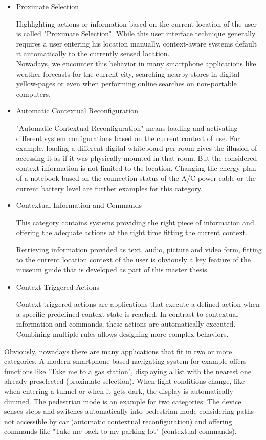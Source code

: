 \begin{itemize}
\item Proximate Selection

Highlighting actions or information based on the current location of the user is called "Proximate Selection". While this user interface technique generally requires a user entering his location manually, context-aware systems default it automatically to the currently sensed location. \\
Nowadays, we encounter this behavior in many smartphone applications like weather forecasts for the current city, searching nearby stores in digital yellow-pages or even when performing online searches on non-portable computers.

\item Automatic Contextual Reconfiguration

"Automatic Contextual Reconfiguration" means loading and activating different system configurations based on the current context of use. For example, loading a different digital whiteboard per room gives the illusion of accessing it as if it was physically mounted in that room. But the considered context information is not limited to the location. Changing the energy plan of a notebook based on the connection status of the A/C power cable or the current battery level are further examples for this category. 

\item Contextual Information and Commands

This category contains systems providing the right piece of information and offering the adequate actions at the right time fitting the current context.

Retrieving information provided as text, audio, picture and video form, fitting to the current location context of the user is obviously a key feature of the museum guide that is developed as part of this master thesis.

\item Context-Triggered Actions

Context-triggered actions are applications that execute a defined action when a specific predefined context-state is reached. In contrast to contextual information and commands, these actions are automatically executed. Combining multiple rules allows designing more complex behaviors.

\end{itemize}




Obviously, nowadays there are many applications that fit in two or more categories. A modern smartphone based navigating system for example offers functions like "Take me to a gas station", displaying a list with the nearest one already preselected (proximate selection). When light conditions change, like when entering a tunnel or when it gets dark, the display is automatically dimmed. The pedestrian mode is an example for two categories: The device senses steps and switches automatically into pedestrian mode considering paths not accessible by car (automatic contextual reconfiguration) and offering commands like "Take me back to my parking lot" (contextual commands).



